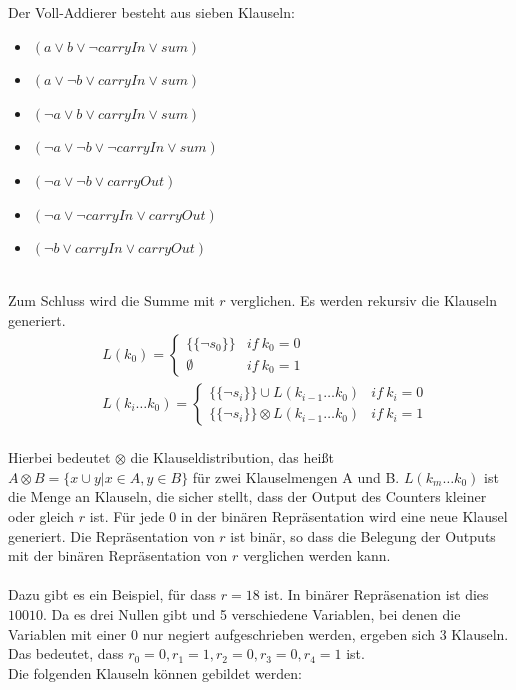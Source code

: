 \documentclass[a4,abstract=on]{scrartcl}
\begin{document}
Der Voll-Addierer besteht aus sieben Klauseln:
\begin{itemize}
\item[] $(a \vee b \vee \neg carryIn \vee sum)$
\item[] $( a \vee \neg b \vee carryIn \vee sum)$
\item[] $(\neg a \vee b \vee carryIn \vee sum )$
\item[] $(\neg a \vee \neg b \vee \neg carryIn \vee sum)$
\item[] $(\neg a \vee \neg b \vee carryOut)$
\item[] $(\neg a \vee \neg carryIn \vee carryOut)$
\item[] $(\neg b \vee carryIn \vee carryOut)$
\end{itemize}
\ \\
Zum Schluss wird die Summe mit $r$ verglichen. Es werden rekursiv die Klauseln generiert.
\begin{align*}
&L(k_0) = \begin{cases} \{\{\neg s_0\}\} & if{~}k_0 = 0\\ \emptyset & if{~}k_0=1\end{cases}\\
&L(k_i \dots k_0) = \begin{cases} \{\{\neg s_i\}\}\cup L(k_{i-1} \dots k_0) & if{~}k_i = 0\\  \{\{\neg s_i\}\}\otimes L(k_{i-1} \dots k_0) & if{~}k_i = 1\end{cases}
\end{align*}
\ \\
Hierbei bedeutet $\otimes$ die Klauseldistribution, das heißt $A \otimes B = \{x \cup y|x \in A, y \in B\}$ für zwei Klauselmengen A und B. $L(k_{m} \dots k_0)$ ist die Menge an Klauseln, die sicher stellt, dass der Output des Counters kleiner oder gleich $r$ ist. Für jede $0$ in der binären Repräsentation wird eine neue Klausel generiert.
Die Repräsentation von $r$ ist binär, so dass die Belegung der Outputs mit der binären Repräsentation von $r$ verglichen werden kann. \\
\ \\
Dazu gibt es ein Beispiel, für dass $r = 18$ ist. In binärer Repräsenation ist dies $10010$. Da es drei Nullen gibt und 5 verschiedene Variablen, bei denen die Variablen mit einer $0$ nur negiert aufgeschrieben werden, ergeben sich 3 Klauseln. Das bedeutet, dass $r_0 = 0, r_1 = 1, r_2 = 0, r_3 = 0, r_4 = 1$ ist.\\
Die folgenden Klauseln können gebildet werden:\\
\end{document}
